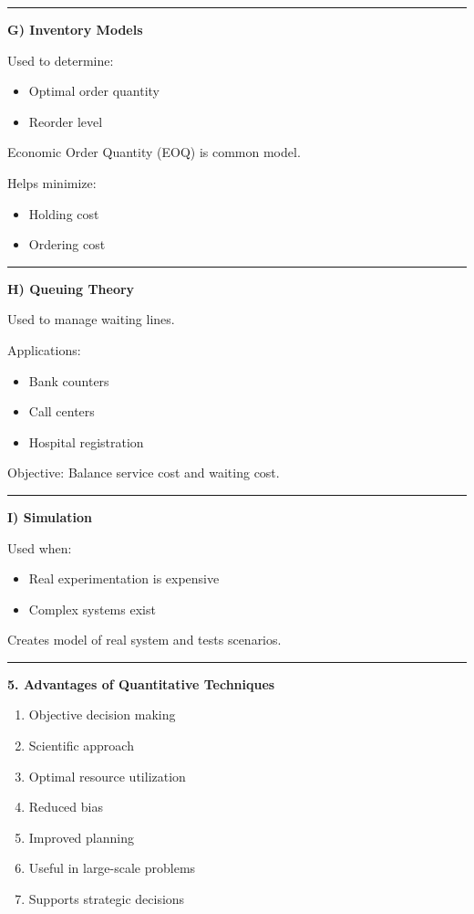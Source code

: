 \documentclass[10pt,a4paper]{article}
\newcommand{\separator}{\vspace{0.4em}\noindent\rule{\linewidth}{0.6pt}\vspace{0.4em}}
\begin{document}
\separator

\textbf{G) Inventory Models}

Used to determine:
\begin{itemize}
  \item Optimal order quantity
  \item Reorder level
\end{itemize}

Economic Order Quantity (EOQ) is common model.

Helps minimize:
\begin{itemize}
  \item Holding cost
  \item Ordering cost
\end{itemize}

\separator

\textbf{H) Queuing Theory}

Used to manage waiting lines.

Applications:
\begin{itemize}
  \item Bank counters
  \item Call centers
  \item Hospital registration
\end{itemize}

Objective: Balance service cost and waiting cost.

\separator

\textbf{I) Simulation}

Used when:
\begin{itemize}
  \item Real experimentation is expensive
  \item Complex systems exist
\end{itemize}

Creates model of real system and tests scenarios.

\separator

\textbf{5. Advantages of Quantitative Techniques}

\begin{enumerate}
  \item Objective decision making
  \item Scientific approach
  \item Optimal resource utilization
  \item Reduced bias
  \item Improved planning
  \item Useful in large-scale problems
  \item Supports strategic decisions
\end{enumerate}
\end{document}
